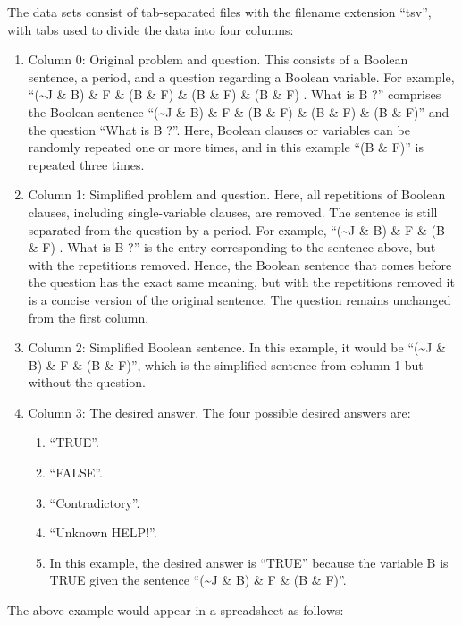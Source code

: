 \documentclass[
]{article}
\begin{document}
The data sets consist of tab-separated files with the filename extension
``tsv'', with tabs used to divide the data into four columns:

\begin{enumerate}
\def\labelenumi{\arabic{enumi}.}
\item
  Column 0: Original problem and question. This consists of a Boolean
  sentence, a period, and a question regarding a Boolean variable. For
  example, ``(\textasciitilde J \& B) \& F \& (B \& F) \& (B \& F) \& (B
  \& F) . What is B ?'' comprises the Boolean sentence
  ``(\textasciitilde J \& B) \& F \& (B \& F) \& (B \& F) \& (B \& F)''
  and the question ``What is B ?''. Here, Boolean clauses or variables
  can be randomly repeated one or more times, and in this example ``(B
  \& F)'' is repeated three times.
\item
  Column 1: Simplified problem and question. Here, all repetitions of
  Boolean clauses, including single-variable clauses, are removed. The
  sentence is still separated from the question by a period. For
  example, ``(\textasciitilde J \& B) \& F \& (B \& F) . What is B ?''
  is the entry corresponding to the sentence above, but with the
  repetitions removed. Hence, the Boolean sentence that comes before the
  question has the exact same meaning, but with the repetitions removed
  it is a concise version of the original sentence. The question remains
  unchanged from the first column.
\item
  Column 2: Simplified Boolean sentence. In this example, it would be
  ``(\textasciitilde J \& B) \& F \& (B \& F)'', which is the simplified
  sentence from column 1 but without the question.
\item
  Column 3: The desired answer. The four possible desired answers are:

  \begin{enumerate}
  \def\labelenumii{\alph{enumii}.}
  \item
    ``TRUE''.
  \item
    ``FALSE''.
  \item
    ``Contradictory''.
  \item
    ``Unknown HELP!''.
  \item
    In this example, the desired answer is ``TRUE'' because the variable
    B is TRUE given the sentence ``(\textasciitilde J \& B) \& F \& (B
    \& F)''.
  \end{enumerate}
\end{enumerate}

The above example would appear in a spreadsheet as follows:
\end{document}
